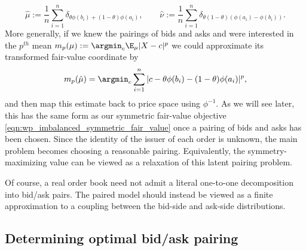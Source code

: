 \[\hat{\mu} := \frac{1}{n} \sum_{i=1}^n
\delta_{\theta\phi(b_i)+(1-\theta)\phi(a_i)}, \qquad
\hat{\nu} := \frac{1}{n} \sum_{i=1}^n
\delta_{\theta(1-\theta)(\phi(a_i)-\phi(b_i))}.\]
\noindent More generally, if we knew the pairings of bids and asks and were
 interested in the $p^{th}$ mean $m_p(\mu) := \argmin_c \E_\mu |X-c|^p$ we
 could approximate its transformed fair-value coordinate by
\[m_p(\hat{\mu}) = \argmin_c \sum_{i=1}^n
|c-\theta\phi(b_i)-(1-\theta)\phi(a_i)|^p,\]
%
\noindent and then map this estimate back to price space using $\phi^{-1}$.
 \noindent As we will see later, this has the same form as our symmetric fair-value objective \eqref{eqn:wp_imbalanced_symmetric_fair_value} once a pairing of bids and asks has been chosen.
 Since the identity of the issuer of each order is unknown, the main problem becomes choosing a reasonable pairing.
 Equivalently, the symmetry-maximizing value can be viewed as a relaxation of this latent pairing problem.

 Of course, a real order book need not admit a literal one-to-one
decomposition into bid/ask pairs. The paired model should instead be viewed as
a finite approximation to a coupling between the bid-side and ask-side
distributions.

\subsection{Determining optimal bid/ask pairing}

